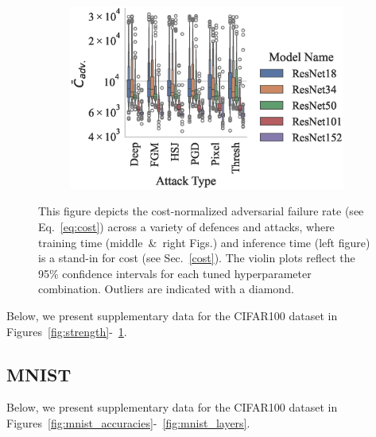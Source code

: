 \begin{figure}
\begin{subfigure}{0.28\textwidth}
        \centering
    \end{subfigure}
    \begin{subfigure}{0.42\textwidth}
        \includegraphics[width=\textwidth]{cifar100/adv_failures_per_train_time_vs_attack_type.eps}
        \centering
    \end{subfigure}
    \caption{This figure depicts the cost-normalized adversarial failure rate (see Eq.~\ref{eq:cost}) across a variety of defences and attacks, where training time (middle~\&~right Figs.) and inference time (left figure) is a stand-in for cost (see Sec.~\ref{cost}). The violin plots reflect the 95\% confidence intervals for each tuned hyperparameter combination. Outliers are indicated with a diamond.}
    \label{fig:failures_per_train_time}
\end{figure}

Below, we present supplementary data for the CIFAR100 dataset in Figures~\ref{fig:strength}-~\ref{fig:failures_per_train_time}.

\subsection{MNIST}
Below, we present supplementary data for the CIFAR100 dataset in Figures~\ref{fig:mnist_accuracies}-~\ref{fig:mnist_layers}.


